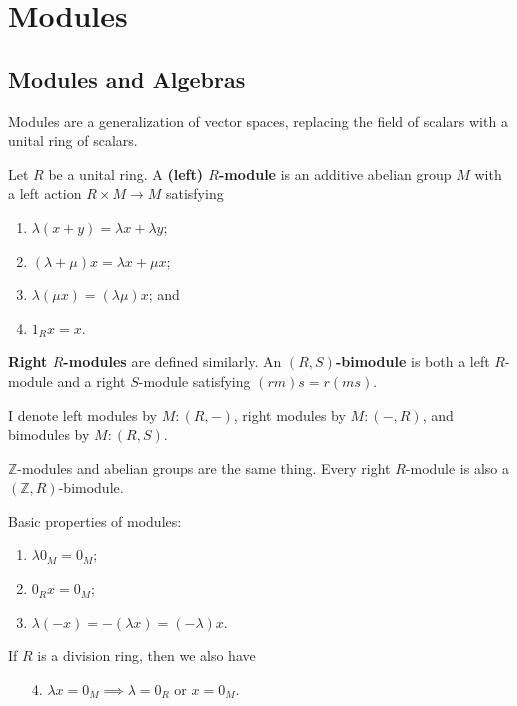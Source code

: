 \documentclass[twoside,10pt]{report}
\begin{document}
\tableofcontents


\chapter{Modules}

\section{Modules and Algebras}

Modules are a generalization of vector spaces, replacing the field of scalars with a unital ring of scalars.

\begin{defn}[]
	Let $R$ be a unital ring. A \textbf{(left) $R$-module} is an additive abelian group $M$ with a left action $R \times M \to  M$ satisfying
\begin{enumerate}
	\item $\lambda(x+y) = \lambda x + \lambda y$;
	\item $(\lambda + \mu)x = \lambda x + \mu x$;
	\item $\lambda(\mu x) = (\lambda \mu)x$; and
	\item $1_{R}x = x$.
\end{enumerate}
\textbf{Right $R$-modules} are defined similarly. An \textbf{$(R,S)$-bimodule} is both a left $R$-module and a right $S$-module satisfying $(rm)s = r(ms)$.
\end{defn}
I denote left modules by $M:(R,-)$, right modules by $M:(-,R)$, and bimodules by $M:(R,S)$.

\begin{ex}[]
	$\mathbb{Z}$-modules and abelian groups are the same thing. Every right $R$-module is also a $(\mathbb{Z},R)$-bimodule.
\end{ex}

\begin{prop}
Basic properties of modules:
\begin{enumerate}
	\item $\lambda 0_{M} = 0_{M}$;
	\item $0_{R}x = 0_{M}$;
	\item $\lambda(-x) = -(\lambda x) = (-\lambda) x$.
\end{enumerate}
If $R$ is a division ring, then we also have
\begin{enumerate}
	\item[4.] $\lambda x = 0_{M} \implies \lambda=0_{R}$ or $x = 0_{M}$.
\end{enumerate}
\end{prop}
\end{document}
